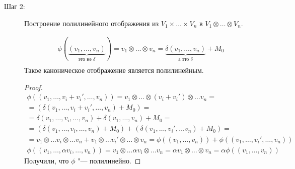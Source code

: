 \begin{description}
\item[Шаг 2:]
	Построение полилинейного отображения из $V_1 \times \dots \times V_n$ в $V_1 \otimes \dots \otimes V_n$.
	\begin{theorem}
	\begin{gather*}
		\phi(\underbrace{(v_1, \dots, v_n)}_{\text{это не $\delta$}}) = v_1 \otimes \dots \otimes v_n = \underbrace{\delta(v_1, \dots, v_n)}_{\text{а это $\delta$}} + M_0 \\
	\end{gather*}
	Такое каноническое отображение является полилинейным.
	\end{theorem}
	\begin{proof}
	\begin{gather*}
		\phi((v_1, \dots, v_i + v_i', \dots, v_n))
		= v_1 \otimes \dots \otimes (v_i + v_i') \otimes \dots v_n = \\
		= (\delta(v_1, \dots, v_i + v_i', \dots, v_n) + M_0) = \\
		=  \delta(v_1, \dots, v_i, \dots, v_n) + \delta(v_1, \dots, v_n) + M_0 = \\
		= (\delta(v_1, \dots, v_i, \dots, v_n) + M_0) + (\delta(v_1,\dots, v_i', \dots v_n) + M_0) = \\
		= v_1 \otimes \dots v_i \otimes \dots v_n + v_1 \otimes \dots v_i' \otimes \dots \otimes v_n
		= \phi ((v_1, \dots, v_n)) + \phi((v_1, \dots, v_i', \dots, v_n)) \\
		\phi((v_1, \dots, \alpha v_i, \dots, v_n))
		= v_1 \otimes \dots \alpha v_i \otimes \dots v_n
		= \alpha v_1 \otimes \dots \otimes v_n
		= \alpha \phi((v_1, \dots, v_n))
	\end{gather*}
	Получили, что $\phi$ "--- полилинейно.
	\end{proof}  


\end{description}
